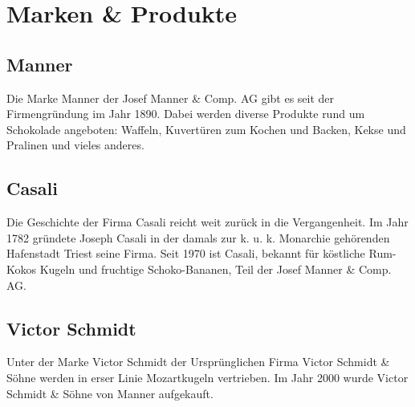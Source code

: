 \section{Marken \& Produkte}
\subsection{Manner}
\noindent
Die Marke Manner der Josef Manner \& Comp. AG gibt es seit der Firmengründung im Jahr 1890. Dabei werden diverse Produkte rund um Schokolade angeboten: Waffeln, Kuvertüren zum Kochen und Backen, Kekse und Pralinen und vieles anderes.\cite{josef_manner_marken}

\subsection{Casali}
\noindent
Die Geschichte der Firma Casali reicht weit zurück in die Vergangenheit. Im Jahr 1782 gründete Joseph Casali in der damals zur k. u. k. Monarchie gehörenden Hafenstadt Triest seine Firma. Seit 1970 ist Casali, bekannt für köstliche Rum-Kokos Kugeln und fruchtige Schoko-Bananen, Teil der Josef Manner \& Comp. AG.\cite{josef_manner_marken}

\subsection{Victor Schmidt}
\noindent
Unter der Marke Victor Schmidt der Ursprünglichen Firma Victor Schmidt \& Söhne werden in erser Linie Mozartkugeln vertrieben. Im Jahr 2000 wurde Victor Schmidt \& Söhne von Manner aufgekauft.\cite{josef_manner_marken}

